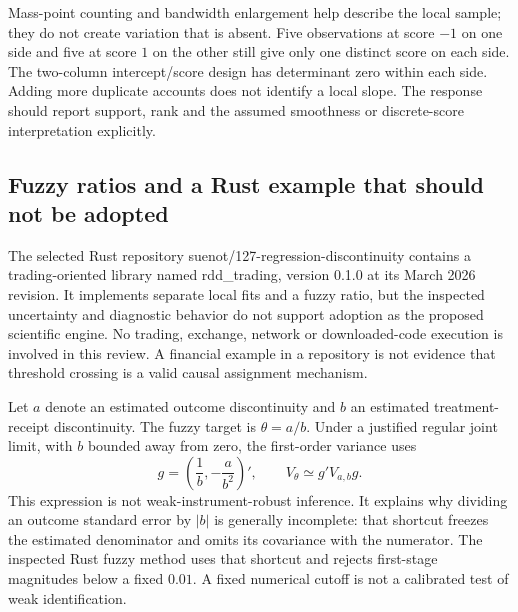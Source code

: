Mass-point counting and bandwidth enlargement help describe the local
sample; they do not create variation that is absent. Five observations
at score $-1$ on one side and five at score $1$ on the other still give
only one distinct score on each side. The two-column intercept/score
design has determinant zero within each side. Adding more duplicate
accounts does not identify a local slope. The response should report
support, rank and the assumed smoothness or discrete-score interpretation
explicitly. \citep{exec23_otheriv_source_3,exec23_otheriv_reference}

\subsection{Fuzzy ratios and a Rust example that should not be adopted}
\label{exec23:otheriv-ratio}
The selected Rust repository suenot/127-regression-discontinuity
contains a trading-oriented library named rdd\_trading, version 0.1.0
at its March 2026 revision. It implements separate local fits and a
fuzzy ratio, but the inspected uncertainty and diagnostic behavior
do not support adoption as the proposed scientific engine. No trading,
exchange, network or downloaded-code execution is involved in this
review. A financial example in a repository is not evidence that
threshold crossing is a valid causal assignment mechanism.
\citep{exec23_otheriv_source_4}

Let $a$ denote an estimated outcome discontinuity and $b$ an estimated
treatment-receipt discontinuity. The fuzzy target is $\theta=a/b$.
Under a justified regular joint limit, with $b$ bounded away from zero,
the first-order variance uses
\begin{equation}
 g=\left(\frac1b,-\frac{a}{b^2}\right)',
 \qquad V_\theta\simeq g'V_{a,b}g.
 \label{exec23:otheriv-delta}
\end{equation}
This expression is not weak-instrument-robust inference. It explains
why dividing an outcome standard error by $|b|$ is generally incomplete:
that shortcut freezes the estimated denominator and omits its covariance
with the numerator. The inspected Rust fuzzy method uses that shortcut
and rejects first-stage magnitudes below a fixed $0.01$. A fixed numerical
cutoff is not a calibrated test of weak identification.
\citep{exec23_otheriv_source_4}

